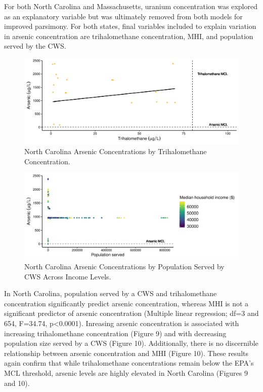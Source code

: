 \documentclass[12pt,]{article}
\begin{document}
For both North Carolina and Massachusetts, uranium concentration was
explored as an explanatory variable but was ultimately removed from both
models for improved parsimony. For both states, final variables included
to explain variation in arsenic concentration are trihalomethane
concentration, MHI, and population served by the CWS.

\begin{figure}
\centering
\includegraphics{Project_Template_files/figure-latex/figs9-1.pdf}
\caption{North Carolina Arsenic Concentrations by Trihalomethane
Concentration.}
\end{figure}

\begin{figure}
\centering
\includegraphics{Project_Template_files/figure-latex/figs10-1.pdf}
\caption{North Carolina Arsenic Concentrations by Population Served by
CWS Across Income Levels.}
\end{figure}

In North Carolina, population served by a CWS and trihalomethane
concentration significantly predict arsenic concentration, whereas MHI
is not a significant predictor of arsenic concentration (Multiple linear
regression; df=3 and 654, F=34.74, p\textless{}0.0001). Inreasing
arsenic concentration is associated with increasing trihalomethane
concentration (Figure 9) and with decreasing population size served by a
CWS (Figure 10). Additionally, there is no discernible relationship
between arsenic concentration and MHI (Figure 10). These results again
confirm that while trihalomethane concentrations remain below the EPA's
MCL threshold, arsenic levels are highly elevated in North Carolina
(Figures 9 and 10).
\end{document}
